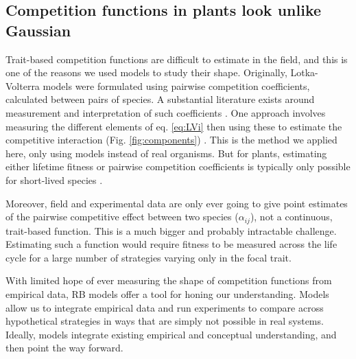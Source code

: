 \documentclass[a4paper,11pt]{article}
\begin{document}
\subsection{Competition functions in plants look unlike Gaussian}

Trait-based competition functions are difficult to estimate in the field, and this is one of the reasons we used models to study their shape. Originally, Lotka-Volterra models were formulated using pairwise competition coefficients, calculated between pairs of species. A substantial literature exists around measurement and interpretation of such coefficients \citep[e.g.][]{Ricklefs-1973, Abrams-1980, Law-1997a,Freckleton-2001, Kraft-2015}. One approach involves measuring the different elements of eq. \ref{eq:LVi} then using these to estimate the competitive interaction (Fig. \ref{fig:components}) \citep{Ricklefs-1973}. This is the method we applied here, only using models instead of real organisms. But for plants, estimating either lifetime fitness or pairwise competition coefficients is typically only possible for short-lived species \citep{Kraft-2015, Mayfield-2017, Law-1997,Freckleton-2001,Laughlin-2020}. 

Moreover, field and experimental data are only ever going to give point estimates of the pairwise competitive effect between two species ($\alpha_{ij}$), not a continuous, trait-based function. This is a much bigger and probably intractable challenge. Estimating such a function would require fitness to be measured across the life cycle for a large number of strategies varying only in the focal trait. 

With limited hope of ever measuring the shape of competition functions from empirical data, RB models offer a tool for honing our understanding. Models allow us to integrate empirical data and run experiments to compare across hypothetical strategies in ways that are simply not possible in real systems. Ideally, models integrate existing empirical and conceptual understanding, and then point the way forward.
\end{document}
